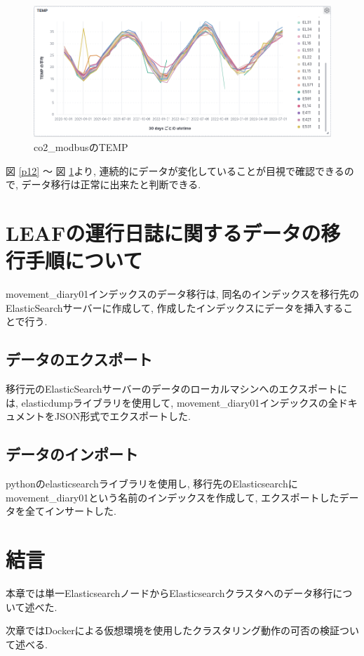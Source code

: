 \begin{figure}[H]
  \begin{center}
    \includegraphics[width=160mm]{sotu/figure/temp.png}
    \caption{co2\_modbusのTEMP}
    \label{p14}
  \end{center}
\end{figure}

図 \ref{p12} 〜 図 \ref{p14}より, 連続的にデータが変化していることが目視で確認できるので, データ移行は正常に出来たと判断できる.


\section{LEAFの運行日誌に関するデータの移行手順について}

movement\_diary01インデックスのデータ移行は, 同名のインデックスを移行先のElasticSearchサーバーに作成して, 作成したインデックスにデータを挿入することで行う.

\subsection{データのエクスポート}
移行元のElasticSearchサーバーのデータのローカルマシンへのエクスポートには, elasticdumpライブラリを使用して, movement\_diary01インデックスの全ドキュメントをJSON形式でエクスポートした.

\subsection{データのインポート}
pythonのelasticsearchライブラリを使用し, 移行先のElasticsearchにmovement\_diary01という名前のインデックスを作成して, エクスポートしたデータを全てインサートした.

\section{結言}
本章では単一ElasticsearchノードからElasticsearchクラスタへのデータ移行について述べた.

次章ではDockerによる仮想環境を使用したクラスタリング動作の可否の検証ついて述べる.